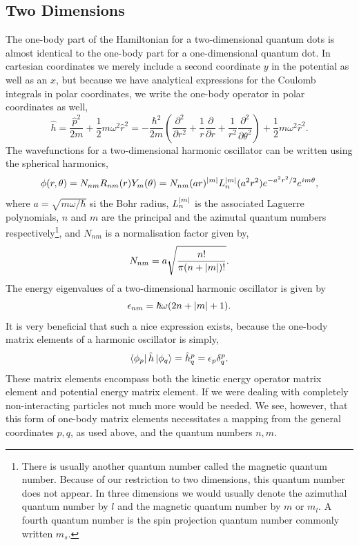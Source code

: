 \subsection{Two Dimensions}

The one-body part of the Hamiltonian for a two-dimensional quantum dots is almost
identical to the one-body part for a one-dimensional quantum dot. In cartesian
coordinates we merely include a second coordinate $y$ in the potential as well as
an $x$, but 
because we have analytical expressions for the Coulomb integrals in polar
coordinates\cite{anisimovas1998energy}, we write the one-body operator in 
polar coordinates as well,
\begin{equation}
    \label{eq:2d_ho_one_body_hamiltonian}
    \hat{h} = \frac{\hat{p}^2}{2m} + \frac{1}{2}m\omega^2\hat{r}^2
        = - \frac{\hbar^2}{2m}\left(
            \frac{\partial^2}{\partial r^2}
            + \frac{1}{r} \frac{\partial}{\partial r}
            + \frac{1}{r^2} \frac{\partial^2}{\partial \theta^2}
        \right)
        + \frac{1}{2}m\omega^2\hat{r}^2.
\end{equation}
The wavefunctions for a two-dimensional harmonic oscillator can be
written using the spherical harmonics,
\begin{equation}
    \label{eq:2d_ho_eigenstate}
    \phi(r,\theta) = N_{nm} R_{nm}(r) Y_m(\theta) = N_{nm} (ar)^{\abs{m}} L_n^{\abs{m}}(a^2r^2)
        e^{-a^2r^2/2} e^{im\theta},
\end{equation}
where $a=\sqrt{m\omega/\hbar}$ si the Bohr radius, $L^{\abs{m}}_n$ is 
the associated Laguerre polynomials, $n$ and $m$ are the principal and
the azimutal quantum numbers respectively\footnote{There is usually another quantum 
number called the magnetic quantum number. Because of our restriction to two dimensions,
this quantum number does not appear. In three dimensions we would usually denote the azimuthal
quantum number by $l$ and the magnetic quantum number by $m$ or $m_l$. A fourth quantum 
number is the spin projection quantum number commonly written $m_s$.}, and $N_{nm}$ is a normalisation 
factor given by,
\begin{equation}
    N_{nm} = a\sqrt{\frac{n!}{\pi(n + \abs{m})!}}.
\end{equation}
The energy eigenvalues of a two-dimensional harmonic oscillator is given by 
\begin{equation}
    \epsilon_{nm} = \hbar\omega(2n + \abs{m} + 1).
\end{equation}
It is very beneficial that such a nice expression exists, because the one-body 
matrix elements of a harmonic oscillator is simply,
\begin{equation}
    \bra{\phi_p}\hat{h}\ket{\phi_q} = \hat{h}^p_q = \epsilon_p \delta^p_q.
\end{equation}
These matrix elements encompass both the kinetic energy operator matrix element and 
potential energy matrix element. If we were dealing with completely non-interacting 
particles not much more would be needed.
We see, however, that this form of one-body matrix elements necessitates a mapping from 
the general coordinates $p,q$, as used above, and the quantum numbers $n,m$.


